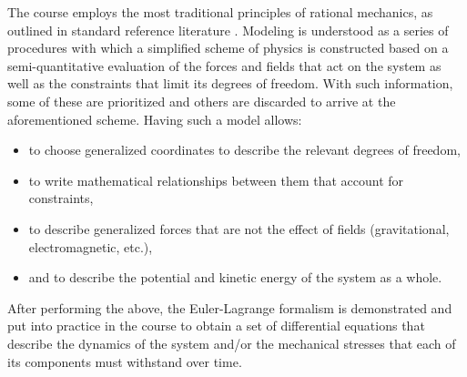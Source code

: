 The course employs the most traditional principles of rational mechanics, as outlined in standard reference literature \cite{landau}.
Modeling is understood as a series of procedures with which a simplified scheme of physics is constructed based on a semi-quantitative evaluation of the forces and fields that act on the system as well as the constraints that limit its degrees of freedom.
With such information, some of these are prioritized and others are discarded to arrive at the aforementioned scheme.
Having such a model allows:
\begin{itemize}
    \item to choose generalized coordinates to describe the relevant degrees of freedom,
    \item to write mathematical relationships between them that account for constraints,
    \item to describe generalized forces that are not the effect of fields (gravitational, electromagnetic, etc.),
    \item and to describe the potential and kinetic energy of the system as a whole.
\end{itemize}

After performing the above, the Euler-Lagrange formalism is demonstrated and put into practice in the course to obtain a set of differential equations that describe the dynamics of the system and/or the mechanical stresses that each of its components must withstand over time.